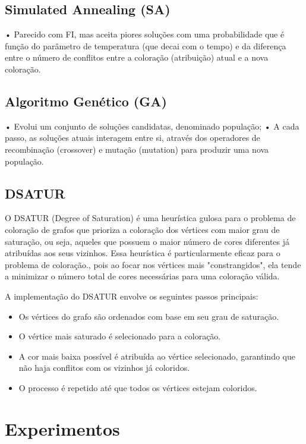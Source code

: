 \documentclass[12pt,a4paper]{article}
\begin{document}
\subsection{Simulated Annealing (SA)}
• Parecido com FI, mas aceita piores soluções com uma probabilidade que é
função do parâmetro de temperatura (que decai com o tempo) e da diferença
entre o número de conflitos entre a coloração (atribuição) atual e a nova
coloração.

\subsection{Algoritmo Genético (GA)}
• Evolui um conjunto de soluções candidatas, denominado população;
• A cada passo, as soluções atuais interagem entre si, através dos operadores
de recombinação (crossover) e mutação (mutation) para produzir uma nova
população.

\subsection{DSATUR}

O DSATUR (Degree of Saturation) é uma heurística gulosa para o problema de coloração de grafos que prioriza a coloração dos vértices com maior grau de saturação, ou seja, aqueles que possuem o maior número de cores diferentes já atribuídas aos seus vizinhos. Essa heurística é particularmente eficaz para o problema de coloração., pois ao focar nos vértices mais "constrangidos", ela tende a minimizar o número total de cores necessárias para uma coloração válida.

A implementação do DSATUR envolve os seguintes passos principais:

\begin{itemize}
 \item Os vértices do grafo são ordenados com base em seu grau de saturação.
 \item O vértice mais saturado é selecionado para a coloração.
 \item A cor mais baixa possível é atribuída ao vértice selecionado, garantindo que não haja conflitos com os vizinhos já coloridos.
 \item O processo é repetido até que todos os vértices estejam coloridos.
\end{itemize}

\section{Experimentos}
\end{document}
